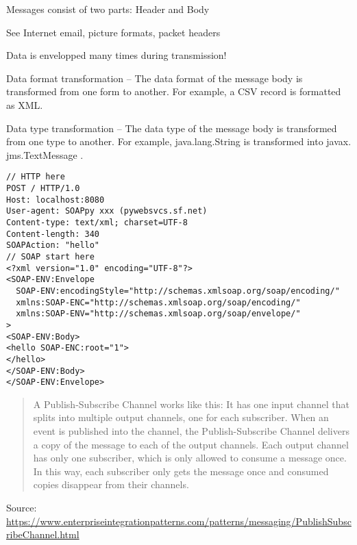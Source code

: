 \documentclass[Screen16to9,17pt]{foils}
\begin{document}


\begin{list2}
\item Messages consist of two parts: Header and Body
\item See Internet email, picture formats, packet headers
\item Data is envelopped many times during transmission!
\item Data format transformation -- The data format of the message body is transformed
from one form to another. For example, a CSV record is formatted as XML.
\item Data type transformation -- The data type of the message body is transformed from
one type to another. For example, java.lang.String is transformed into javax.
jms.TextMessage .
\end{list2}



\begin{verbatim}
// HTTP here
POST / HTTP/1.0
Host: localhost:8080
User-agent: SOAPpy xxx (pywebsvcs.sf.net)
Content-type: text/xml; charset=UTF-8
Content-length: 340
SOAPAction: "hello"
// SOAP start here
<?xml version="1.0" encoding="UTF-8"?>
<SOAP-ENV:Envelope
  SOAP-ENV:encodingStyle="http://schemas.xmlsoap.org/soap/encoding/"
  xmlns:SOAP-ENC="http://schemas.xmlsoap.org/soap/encoding/"
  xmlns:SOAP-ENV="http://schemas.xmlsoap.org/soap/envelope/"
>
<SOAP-ENV:Body>
<hello SOAP-ENC:root="1">
</hello>
</SOAP-ENV:Body>
</SOAP-ENV:Envelope>
\end{verbatim}



\begin{quote}\footnotesize
A Publish-Subscribe Channel works like this: It has one input channel that splits into multiple output channels, one for each subscriber. When an event is published into the channel, the Publish-Subscribe Channel delivers a copy of the message to each of the output channels. Each output channel has only one subscriber, which is only allowed to consume a message once. In this way, each subscriber only gets the message once and consumed copies disappear from their channels.
\end{quote}

{\footnotesize Source:\\ \url{https://www.enterpriseintegrationpatterns.com/patterns/messaging/PublishSubscribeChannel.html}}
\end{document}
